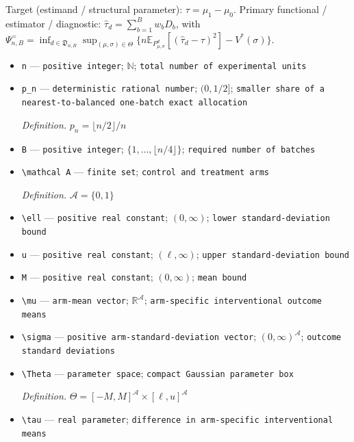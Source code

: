 \documentclass{article}
\begin{document}
Target (estimand / structural parameter): \(\tau=\mu_1-\mu_0\).
Primary functional / estimator / diagnostic: \(\widehat\tau_d=\sum_{b=1}^B w_bD_b\), with \(\Psi^{=}_{n,B}=\inf_{d\in\mathfrak D_{n,B}}\sup_{(\mu,\sigma)\in\Theta}\{n\mathbb E_{P^{d}_{\mu,\sigma}}[(\widehat\tau_d-\tau)^2]-V^*(\sigma)\}\).
\begin{itemize}
  \item \texttt{n} --- \texttt{positive integer}; \(\mathbb N\); \texttt{total number of experimental units}
  \item \texttt{p\_\allowbreak{}n} --- \texttt{deterministic rational number}; \((0,1/2]\); \texttt{smaller share of a nearest-\allowbreak{}to-\allowbreak{}balanced one-\allowbreak{}batch exact allocation}
  \par\smallskip\noindent\emph{Definition.} \(p_n=\lfloor n/2\rfloor/n\)
  \item \texttt{B} --- \texttt{positive integer}; \(\{1,\ldots,\lfloor n/4\rfloor\}\); \texttt{required number of batches}
  \item \texttt{\textbackslash{}\allowbreak{}mathcal A} --- \texttt{finite set}; \texttt{control and treatment arms}
  \par\smallskip\noindent\emph{Definition.} \(\mathcal A=\{0,1\}\)
  \item \texttt{\textbackslash{}\allowbreak{}ell} --- \texttt{positive real constant}; \((0,\infty)\); \texttt{lower standard-\allowbreak{}deviation bound}
  \item \texttt{u} --- \texttt{positive real constant}; \((\ell,\infty)\); \texttt{upper standard-\allowbreak{}deviation bound}
  \item \texttt{M} --- \texttt{positive real constant}; \((0,\infty)\); \texttt{mean bound}
  \item \texttt{\textbackslash{}\allowbreak{}mu} --- \texttt{arm-\allowbreak{}mean vector}; \(\mathbb R^{\mathcal A}\); \texttt{arm-\allowbreak{}specific interventional outcome means}
  \item \texttt{\textbackslash{}\allowbreak{}sigma} --- \texttt{positive arm-\allowbreak{}standard-\allowbreak{}deviation vector}; \((0,\infty)^{\mathcal A}\); \texttt{outcome standard deviations}
  \item \texttt{\textbackslash{}\allowbreak{}Theta} --- \texttt{parameter space}; \texttt{compact Gaussian parameter box}
  \par\smallskip\noindent\emph{Definition.} \(\Theta=[-M,M]^{\mathcal A}\times[\ell,u]^{\mathcal A}\)
  \item \texttt{\textbackslash{}\allowbreak{}tau} --- \texttt{real parameter}; \texttt{difference in arm-\allowbreak{}specific interventional means}

\end{itemize}
\end{document}
